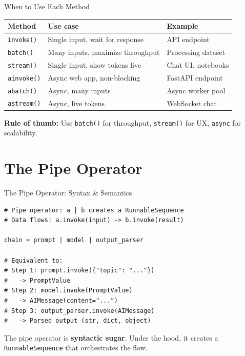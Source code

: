 \documentclass[aspectratio=169,11pt]{beamer}
\begin{document}
\begin{frame}{When to Use Each Method}
  \begin{tabular}{|l|l|l|}
    \hline
    \textbf{Method} & \textbf{Use case} & \textbf{Example} \\
    \hline
    \texttt{invoke()} & Single input, wait for response & API endpoint \\
    \hline
    \texttt{batch()} & Many inputs, maximize throughput & Processing dataset \\
    \hline
    \texttt{stream()} & Single input, show tokens live & Chat UI, notebooks \\
    \hline
    \texttt{ainvoke()} & Async web app, non-blocking & FastAPI endpoint \\
    \hline
    \texttt{abatch()} & Async, many inputs & Async worker pool \\
    \hline
    \texttt{astream()} & Async, live tokens & WebSocket chat \\
    \hline
  \end{tabular}

  \vspace{0.3em}
  \small \textbf{Rule of thumb:} Use \texttt{batch()} for throughput, \texttt{stream()} for UX, \texttt{async} for scalability.
\end{frame}

\section{The Pipe Operator}

\begin{frame}[fragile]{The Pipe Operator: Syntax \& Semantics}
  \begin{codebox}
\begin{lstlisting}
# Pipe operator: a | b creates a RunnableSequence
# Data flows: a.invoke(input) -> b.invoke(result)

chain = prompt | model | output_parser

# Equivalent to:
# Step 1: prompt.invoke({"topic": "..."})
#   -> PromptValue
# Step 2: model.invoke(PromptValue)
#   -> AIMessage(content="...")
# Step 3: output_parser.invoke(AIMessage)
#   -> Parsed output (str, dict, object)
\end{lstlisting}
  \end{codebox}

  \vspace{0.12em}
  \begin{tipbox}
    The pipe operator is \textbf{syntactic sugar}. Under the hood, it creates a
    \texttt{RunnableSequence} that orchestrates the flow.
  \end{tipbox}
\end{frame}
\end{document}

